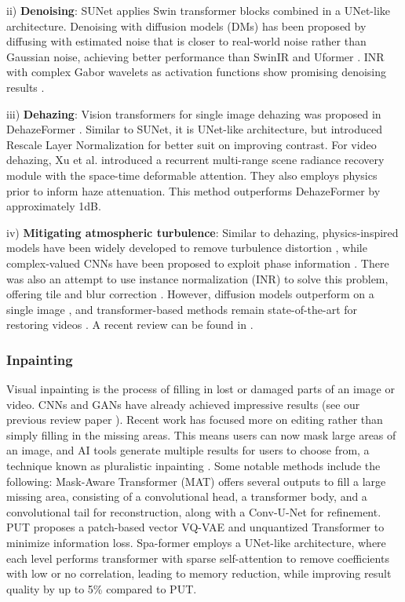 \documentclass[11pt,a4paper]{article}
\begin{document}
ii) \textbf{Denoising}: SUNet \cite{Fan:SUNet:2022} applies Swin transformer blocks combined in a UNet-like architecture. Denoising with diffusion models (DMs) \cite{yang:realworld:2023} has been proposed by diffusing with estimated noise that is closer to real-world noise rather than Gaussian noise, achieving better performance than SwinIR \cite{Liang:SwinIR:2021} and Uformer \cite{Wang:Uformer:2022}. INR with complex Gabor wavelets as activation functions show promising denoising results \cite{Saragadam:wire:2023}.

iii) \textbf{Dehazing}: Vision transformers for single image dehazing was proposed in DehazeFormer \cite{Song:vision:2023}. Similar to SUNet, it is UNet-like architecture, but introduced Rescale Layer Normalization for better suit on improving contrast. For video dehazing, Xu et al. \cite{Xu:Video:2023} introduced a recurrent multi-range scene radiance recovery module with the space-time deformable attention. They also employs physics prior to inform haze attenuation. This method outperforms DehazeFormer by approximately 1dB.

iv) \textbf{Mitigating atmospheric turbulence}: Similar to dehazing, physics-inspired models have been widely developed to remove turbulence distortion \cite{Jaiswal:Physics:2023,Jiang:NeRT:2023}, while complex-valued CNNs have been proposed to exploit phase information \cite{Atmospheric:2023}. There was also an attempt to use instance normalization (INR) to solve this problem, offering tile and blur correction \cite{Jiang:NeRT:2023}. However, diffusion models outperform on a single image \cite{Nair:AT-DDPM:2023}, and transformer-based methods remain state-of-the-art for restoring videos \cite{Zhang:Image:2024, zou2024deturb}. A recent review can be found in \cite{Hill2025}.

\subsubsection{Inpainting}
\label{ssec:inpaiting}

Visual inpainting is the process of filling in lost or damaged parts of an image or video. CNNs and GANs have already achieved impressive results (see our previous review paper \cite{Anantrasirichai:AI:2022}). Recent work has focused more on editing rather than simply filling in the missing areas. This means users can now mask large areas of an image, and AI tools generate multiple results for users to choose from, a technique known as pluralistic inpainting \cite{zheng:pluralistic:2019}. Some notable methods include the following: Mask-Aware Transformer (MAT) \cite{Li:MAT:2022} offers several outputs to fill a large missing area, consisting of a convolutional head, a transformer body, and a convolutional tail for reconstruction, along with a Conv-U-Net for refinement. PUT \cite{Liu:Reduce:2022} proposes a patch-based vector VQ-VAE and unquantized Transformer to minimize information loss. Spa-former \cite{HUANG:Sparse:2024} employs a UNet-like architecture, where each level performs transformer with sparse self-attention to remove coefficients with low or no correlation, leading to memory reduction, while improving result quality by up to 5\% compared to PUT.
\end{document}
